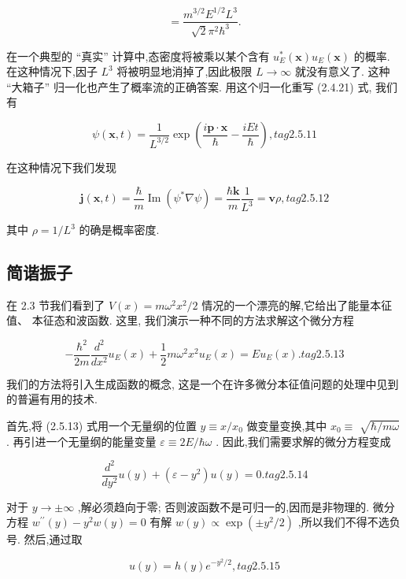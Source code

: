 \documentclass[lang=cn,newtx,10pt,scheme=chinese,thmcnt=section]{elegantbook}
\begin{document}
$$
= \frac{{m}^{3/2}{E}^{1/2}{L}^{3}}{\sqrt{2}{\pi }^{2}{\hbar }^{3}}.
$$

在一个典型的 “真实” 计算中,态密度将被乘以某个含有 ${u}_{E}^{ * }\left( \mathbf{x}\right) {u}_{E}\left( \mathbf{x}\right)$ 的概率. 在这种情况下,因子 ${L}^{3}$ 将被明显地消掉了,因此极限 $L \rightarrow \infty$ 就没有意义了. 这种 “大箱子” 归一化也产生了概率流的正确答案. 用这个归一化重写 (2.4.21) 式, 我们有

$$
\psi \left( {\mathbf{x}, t}\right) = \frac{1}{{L}^{3/2}}\exp \left( {\frac{i\mathbf{p} \cdot \mathbf{x}}{\hbar } - \frac{iEt}{\hbar }}\right) , tag{2.5.11}
$$

在这种情况下我们发现

$$
\mathbf{j}\left( {\mathbf{x}, t}\right) = \frac{\hbar }{m}\operatorname{Im}\left( {{\psi }^{ * }\nabla \psi }\right) = \frac{\hbar \mathbf{k}}{m}\frac{1}{{L}^{3}} = \mathbf{v}\rho , tag{2.5.12}
$$

其中 $\rho = 1/{L}^{3}$ 的确是概率密度.


\subsection*{简谐振子}
在 2.3 节我们看到了 $V\left( x\right) = m{\omega }^{2}{x}^{2}/2$ 情况的一个漂亮的解,它给出了能量本征值、 本征态和波函数. 这里, 我们演示一种不同的方法求解这个微分方程

$$
- \frac{{\hbar }^{2}}{2m}\frac{{d}^{2}}{d{x}^{2}}{u}_{E}\left( x\right) + \frac{1}{2}m{\omega }^{2}{x}^{2}{u}_{E}\left( x\right) = E{u}_{E}\left( x\right) . tag{2.5.13}
$$

我们的方法将引入生成函数的概念, 这是一个在许多微分本征值问题的处理中见到的普遍有用的技术.

首先,将 (2.5.13) 式用一个无量纲的位置 $y \equiv x/{x}_{0}$ 做变量变换,其中 ${x}_{0} \equiv$ $\sqrt{\hbar /{m\omega }}$ . 再引进一个无量纲的能量变量 $\varepsilon \equiv {2E}/\hbar \omega$ . 因此,我们需要求解的微分方程变成

$$
\frac{{d}^{2}}{d{y}^{2}}u\left( y\right) + \left( {\varepsilon - {y}^{2}}\right) u\left( y\right) = 0. tag{2.5.14}
$$

对于 $y \rightarrow \pm \infty$ ,解必须趋向于零; 否则波函数不是可归一的,因而是非物理的. 微分方程 ${w}^{\prime \prime }\left( y\right) - {y}^{2}w\left( y\right) = 0$ 有解 $w\left( y\right) \propto \exp \left( {\pm {y}^{2}/2}\right)$ ,所以我们不得不选负号. 然后,通过取

$$
u\left( y\right) = h\left( y\right) {e}^{-{y}^{2}/2}, tag{2.5.15}
$$
\end{document}
